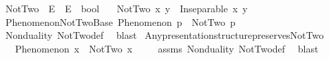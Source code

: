 \begin{isabellebody}
%
\isatagdocument
%
\isamarkuptrue%
%
\endisatagdocument
{\isafolddocument}%
%
\isadelimdocument
%
\endisadelimdocument
{}\isamarkupfalse%
\ NotTwo\ {\isacharcolon}{\kern0pt}{\isacharcolon}{\kern0pt}\ {\isachardoublequoteopen}E\ {\isasymRightarrow}\ E\ {\isasymRightarrow}\ bool{\isachardoublequoteclose}\isanewline
\ \ \ {\isachardoublequoteopen}NotTwo\ x\ y\ {\isasymlongleftrightarrow}\ Inseparable\ x\ y{\isachardoublequoteclose}\isanewline
\isanewline
{}\isamarkupfalse%
\ Phenomenon{\isacharunderscore}{\kern0pt}NotTwo{\isacharunderscore}{\kern0pt}Base{\isacharcolon}{\kern0pt}\ {\isachardoublequoteopen}Phenomenon\ p\ {\isasymLongrightarrow}\ NotTwo\ p\ {\isasymOmega}{\isachardoublequoteclose}\isanewline
%
\isadelimproof
\ \ %
\endisadelimproof
%
\isatagproof
{}\isamarkupfalse%
\ Nonduality\ NotTwo{\isacharunderscore}{\kern0pt}def\ \isamarkupfalse%
\ blast%
\endisatagproof
{\isafoldproof}%
%
\isadelimproof
\isanewline
%
\endisadelimproof
\isanewline
{}\isamarkupfalse%
\ Any{\isacharunderscore}{\kern0pt}presentation{\isacharunderscore}{\kern0pt}structure{\isacharunderscore}{\kern0pt}preserves{\isacharunderscore}{\kern0pt}NotTwo{\isacharcolon}{\kern0pt}\isanewline
\ \ \ {\isachardoublequoteopen}Phenomenon\ x{\isachardoublequoteclose}\ \ {\isachardoublequoteopen}NotTwo\ x\ {\isasymOmega}{\isachardoublequoteclose}\isanewline
%
\isadelimproof
\ \ %
\endisadelimproof
%
\isatagproof
{}\isamarkupfalse%
\ assms\ Nonduality\ NotTwo{\isacharunderscore}{\kern0pt}def\ \isamarkupfalse%
\ blast%
\endisatagproof
{\isafoldproof}%
%
\isadelimproof
\isanewline
%
\endisadelimproof
%
\isadelimtheory
\isanewline
%
\endisadelimtheory
%
\isatagtheory
{}\isamarkupfalse%
%
\endisatagtheory
{\isafoldtheory}%
%
\isadelimtheory
%
\endisadelimtheory
%
\end{isabellebody}%
\endinput
